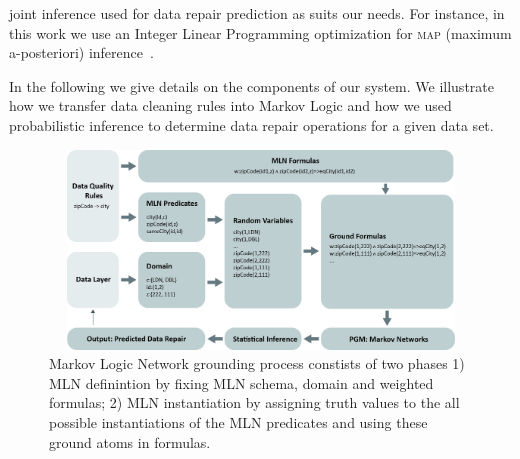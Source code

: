 joint inference used for data repair prediction as suits our needs. For instance, in this work we use an Integer Linear Programming optimization for \textsc{map} (maximum a-posteriori) inference~\cite{NoessnerNS13}.
    
In the following we give details on the components of our system. We illustrate how we transfer data cleaning rules into Markov Logic
and how we used probabilistic inference to determine data repair operations for a given data set. 




\begin{figure}[t]
 \centering
 \includegraphics[width=450px, height=200px]{img/mlogic-grounging.jpg}
 \caption{Markov Logic Network grounding process constists of two phases 1) MLN definintion by fixing MLN schema, domain and weighted formulas; 2) MLN instantiation by assigning truth values to the all possible instantiations of the MLN predicates and using these ground atoms in formulas.}
 \label{fig:mlngrounding}
\end{figure}

